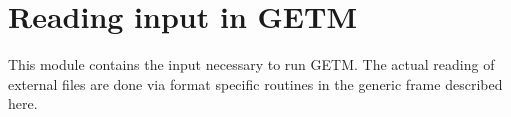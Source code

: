 \section{Reading input in GETM}

This module contains the input necessary to run GETM. The actual 
reading of external files are done via format specific routines in the
generic frame described here.

